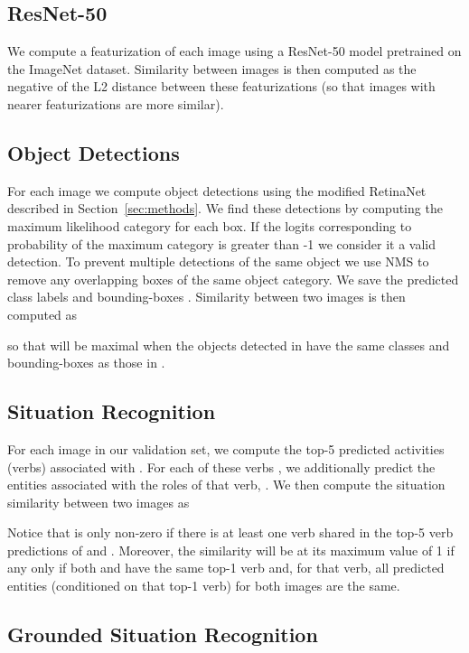 \documentclass[runningheads]{llncs}
\begin{document}
\subsection{ResNet-50}

We compute a featurization of each image using a ResNet-50 model pretrained on the ImageNet dataset. Similarity between images is then computed as the negative of the L2 distance between these featurizations (so that images with nearer featurizations are more similar).

\subsection{Object Detections}

For each image  we compute object detections using the modified RetinaNet described in Section~\ref{sec:methods}. We find these detections by computing the maximum likelihood category for each box. If the logits corresponding to probability of the maximum category is greater than -1 we consider it a valid detection. To prevent multiple detections of the same object we use NMS to remove any overlapping boxes of the same object category. We save the predicted class labels  and bounding-boxes . Similarity between two images  is then computed as

so that  will be maximal when the objects detected in  have the same classes and bounding-boxes as those in .

\subsection{Situation Recognition}

For each image  in our validation set, we compute  the top-5 predicted activities (verbs) associated with . For each of these verbs , we additionally predict the entities associated with the roles of that verb, . We then compute the situation similarity between two images  as

Notice that  is only non-zero if there is at least one verb shared in the top-5 verb predictions of  and . Moreover, the similarity will be at its maximum value of 1 if any only if both  and  have the same top-1 verb and, for that verb, all predicted entities (conditioned on that top-1 verb) for both images are the same.

\subsection{Grounded Situation Recognition}
\end{document}
